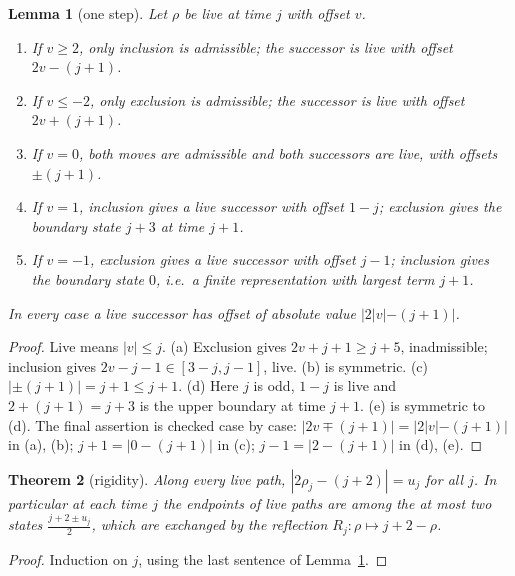 \documentclass[11pt]{amsart}
\newtheorem{theorem}{Theorem}[section]
\newtheorem{lemma}[theorem]{Lemma}
\theoremstyle{definition}
\theoremstyle{remark}
\begin{document}
\begin{lemma}[one step]\label{lem:step}
Let $\rho$ be live at time $j$ with offset $v$.
\begin{enumerate}[label=\textup{(\alph*)}]
\item If $v\ge2$, only inclusion is admissible; the successor is live with offset $2v-(j+1)$.
\item If $v\le-2$, only exclusion is admissible; the successor is live with offset $2v+(j+1)$.
\item If $v=0$, both moves are admissible and both successors are live, with offsets $\pm(j+1)$.
\item If $v=1$, inclusion gives a live successor with offset $1-j$; exclusion gives the boundary state $j+3$ at time $j+1$.
\item If $v=-1$, exclusion gives a live successor with offset $j-1$; inclusion gives the boundary state $0$, i.e.\ a finite representation with largest term $j+1$.
\end{enumerate}
In every case a live successor has offset of absolute value $|2|v|-(j+1)|$.
\end{lemma}

\begin{proof}
Live means $|v|\le j$. (a) Exclusion gives $2v+j+1\ge j+5$, inadmissible; inclusion gives $2v-j-1\in[3-j,j-1]$, live. (b) is symmetric. (c) $|\pm(j+1)|=j+1\le j+1$. (d) Here $j$ is odd, $1-j$ is live and $2+(j+1)=j+3$ is the upper boundary at time $j+1$. (e) is symmetric to (d). The final assertion is checked case by case: $|2v\mp(j+1)|=|2|v|-(j+1)|$ in (a), (b); $j+1=|0-(j+1)|$ in (c); $j-1=|2-(j+1)|$ in (d), (e).
\end{proof}

\begin{theorem}[rigidity]\label{thm:rigid}
Along every live path, $|2\rho_j-(j+2)|=u_j$ for all $j$. In particular at each time $j$ the endpoints of live paths are among the at most two states $\frac{j+2\pm u_j}{2}$, which are exchanged by the reflection $R_j\colon\rho\mapsto j+2-\rho$.
\end{theorem}

\begin{proof}
Induction on $j$, using the last sentence of Lemma~\ref{lem:step}.
\end{proof}
\end{document}
